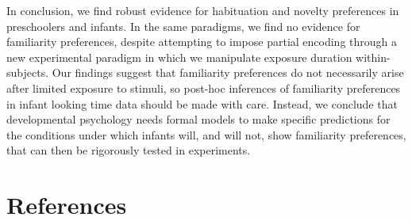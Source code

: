 \documentclass[10pt, letterpaper]{article}
\begin{document}
In conclusion, we find robust evidence for habituation and novelty
preferences in preschoolers and infants. In the same paradigms, we find
no evidence for familiarity preferences, despite attempting to impose
partial encoding through a new experimental paradigm in which we
manipulate exposure duration within-subjects. Our findings suggest that
familiarity preferences do not necessarily arise after limited exposure
to stimuli, so post-hoc inferences of familiarity preferences in infant
looking time data should be made with care. Instead, we conclude that
developmental psychology needs formal models to make specific
predictions for the conditions under which infants will, and will not,
show familiarity preferences, that can then be rigorously tested in
experiments.

\hypertarget{references}{%
\section{References}\label{references}}

\setlength{\parindent}{-0.1in} 
\setlength{\leftskip}{0.125in}

\noindent
\end{document}

